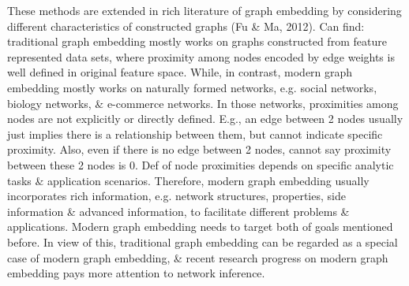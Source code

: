 \documentclass{article}
\begin{document}
\begin{itemize}
\begin{itemize}
        These methods are extended in rich literature of graph embedding by considering different characteristics of constructed graphs (Fu \& Ma, 2012). Can find: traditional graph embedding mostly works on graphs constructed from feature represented data sets, where proximity among nodes encoded by edge weights is well defined in original feature space. While, in contrast, modern graph embedding mostly works on naturally formed networks, e.g. social networks, biology networks, \& e-commerce networks. In those networks, proximities among nodes are not explicitly or directly defined. E.g., an edge between 2 nodes usually just implies there is a relationship between them, but cannot indicate specific proximity. Also, even if there is no edge between 2 nodes, cannot say proximity between these 2 nodes is 0. Def of node proximities depends on specific analytic tasks \& application scenarios. Therefore, modern graph embedding usually incorporates rich information, e.g. network structures, properties, side information \& advanced information, to facilitate different problems \& applications. Modern graph embedding needs to target both of goals mentioned before. In view of this, traditional graph embedding can be regarded as a special case of modern graph embedding, \& recent research progress on modern graph embedding pays more attention to network inference.


\end{itemize}
\end{itemize}
\end{document}
